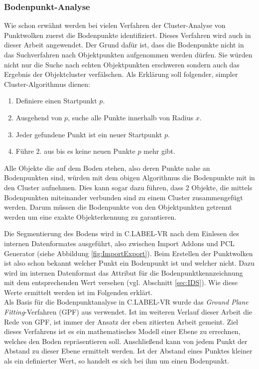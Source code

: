 \subsubsection{Bodenpunkt-Analyse}
\label{sec:GroundPointSegmentation}
Wie schon erwähnt werden bei vielen Verfahren der Cluster-Analyse von Punktwolken zuerst die Bodenpunkte identifiziert. Dieses Verfahren wird auch in dieser Arbeit angewendet. Der Grund dafür ist, dass die Bodenpunkte nicht in das Suchverfahren nach Objektpunkten aufgenommen werden dürfen. Sie würden nicht nur die Suche nach echten Objektpunkten erschweren sondern auch das Ergebnis der Objektcluster verfälschen. Als Erklärung soll folgender, simpler Cluster-Algorithmus dienen:

\begin{enumerate}
\item Definiere einen Startpunkt $p$.
\item Ausgehend von $p$, suche alle Punkte innerhalb von Radius \(x\). 
\item Jeder gefundene Punkt ist ein neuer Startpunkt $p$.
\item Führe 2. aus bis es keine neuen Punkte $p$ mehr gibt.
\end{enumerate} 

Alle Objekte die auf dem Boden stehen, also deren Punkte nahe an Bodenpunkten sind, würden mit dem obigen Algorithmus die Bodenpunkte mit in den Cluster aufnehmen. Dies kann sogar dazu führen, dass 2 Objekte, die mittels Bodenpunkten miteinander verbunden sind zu einem Cluster zusammengefügt werden. Darum müssen die Bodenpunkte von den Objektpunkten getrennt werden um eine exakte Objekterkennung zu garantieren.

Die Segmentierung des Bodens wird in C.LABEL-VR nach dem Einlesen des internen Datenformates ausgeführt, also zwischen Import Addons und PCL Generator (siehe Abbildung \ref{fig:ImportExport}). Beim Erstellen der Punktwolken ist also schon bekannt welcher Punkt ein Bodenpunkt ist und welcher nicht. Dazu wird im internen Datenformat das Attribut für die Bodenpunktkennzeichnung mit dem entsprechenden Wert versehen (vgl. Abschnitt \ref{sec:IDS}). Wie diese Werte ermittelt werden ist im Folgenden erklärt.\\

Als Basis für die Bodenpunktanalyse in C.LABEL-VR wurde das \textit{Ground Plane Fitting}-Verfahren (GPF) aus \cite{bib:Segmentation1} verwendet. Ist im weiteren Verlauf dieser Arbeit die Rede von GPF, ist immer der Ansatz der eben zitierten Arbeit gemeint. Ziel dieses Verfahrens ist es ein mathematisches Modell einer Ebene zu errechnen, welches den Boden repräsentieren soll. Anschließend kann von jedem Punkt der Abstand zu dieser Ebene ermittelt werden. Ist der Abstand eines Punktes kleiner als ein definierter Wert, so handelt es sich bei ihm um einen Bodenpunkt.

